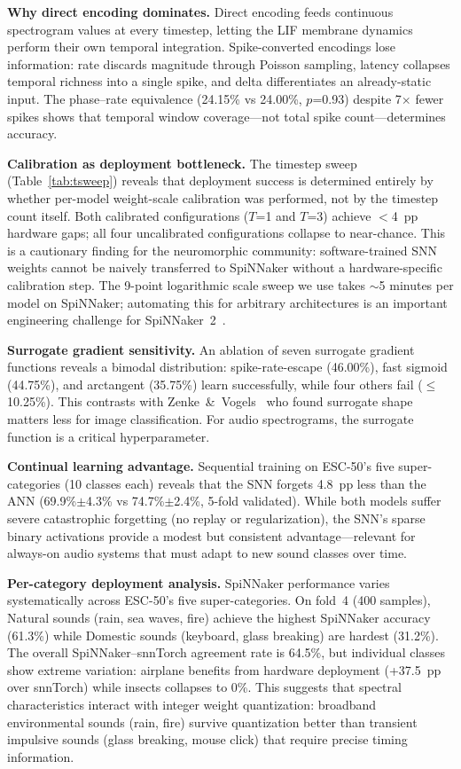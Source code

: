 \documentclass[sigconf,nonacm=false]{acmart}
\begin{document}
\textbf{Why direct encoding dominates.}
Direct encoding feeds continuous spectrogram values at every timestep, letting the LIF membrane dynamics perform their own temporal integration.
Spike-converted encodings lose information: rate discards magnitude through Poisson sampling, latency collapses temporal richness into a single spike, and delta differentiates an already-static input.
The phase--rate equivalence (24.15\% vs 24.00\%, $p$=0.93) despite 7$\times$ fewer spikes shows that temporal window coverage---not total spike count---determines accuracy.

\textbf{Calibration as deployment bottleneck.}
The timestep sweep (Table~\ref{tab:tsweep}) reveals that deployment success is determined entirely by whether per-model weight-scale calibration was performed, not by the timestep count itself.
Both calibrated configurations ($T$=1 and $T$=3) achieve $<$4~pp hardware gaps; all four uncalibrated configurations collapse to near-chance.
This is a cautionary finding for the neuromorphic community: software-trained SNN weights cannot be naively transferred to SpiNNaker without a hardware-specific calibration step.
The 9-point logarithmic scale sweep we use takes $\sim$5 minutes per model on SpiNNaker; automating this for arbitrary architectures is an important engineering challenge for SpiNNaker~2~\cite{hoppner2024}.

\textbf{Surrogate gradient sensitivity.}
An ablation of seven surrogate gradient functions reveals a bimodal distribution: spike-rate-escape (46.00\%), fast sigmoid (44.75\%), and arctangent (35.75\%) learn successfully, while four others fail ($\leq$10.25\%).
This contrasts with Zenke~\&~Vogels~\cite{zenke2021} who found surrogate shape matters less for image classification.
For audio spectrograms, the surrogate function is a critical hyperparameter.

\textbf{Continual learning advantage.}
Sequential training on ESC-50's five super-categories (10 classes each) reveals that the SNN forgets 4.8~pp less than the ANN (69.9\%$\pm$4.3\% vs 74.7\%$\pm$2.4\%, 5-fold validated).
While both models suffer severe catastrophic forgetting (no replay or regularization), the SNN's sparse binary activations provide a modest but consistent advantage---relevant for always-on audio systems that must adapt to new sound classes over time.

\textbf{Per-category deployment analysis.}
SpiNNaker performance varies systematically across ESC-50's five super-categories.
On fold~4 (400 samples), Natural sounds (rain, sea waves, fire) achieve the highest SpiNNaker accuracy (61.3\%) while Domestic sounds (keyboard, glass breaking) are hardest (31.2\%).
The overall SpiNNaker--snnTorch agreement rate is 64.5\%, but individual classes show extreme variation: airplane benefits from hardware deployment (+37.5~pp over snnTorch) while insects collapses to 0\%.
This suggests that spectral characteristics interact with integer weight quantization: broadband environmental sounds (rain, fire) survive quantization better than transient impulsive sounds (glass breaking, mouse click) that require precise timing information.
\end{document}
